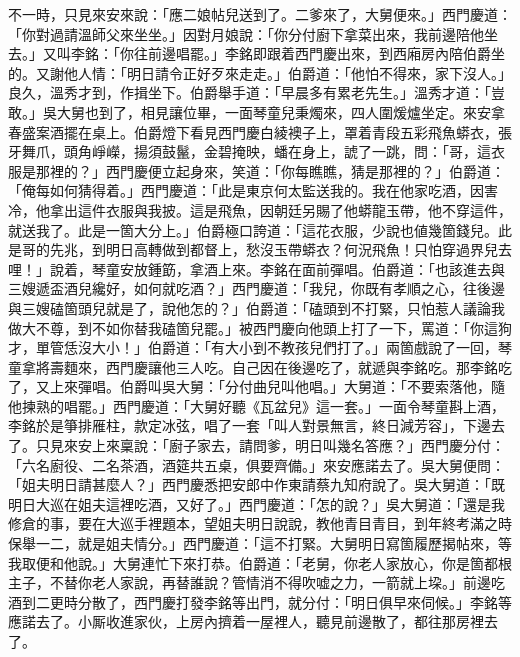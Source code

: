 不一時，只見來安來說：「應二娘帖兒送到了。二爹來了，大舅便來。」西門慶道：「你對過請溫師父來坐坐。」因對月娘說：「你分付廚下拿菜出來，我前邊陪他坐去。」又叫李銘：「你往前邊唱罷。」李銘即跟着西門慶出來，到西廂房內陪伯爵坐的。又謝他人情：「明日請令正好歹來走走。」伯爵道：「他怕不得來，家下沒人。」良久，溫秀才到，作揖坐下。伯爵舉手道：「早晨多有累老先生。」溫秀才道：「豈敢。」吳大舅也到了，相見讓位畢，一面琴童兒秉燭來，四人圍煖爐坐定。來安拿春盛案酒擺在桌上。伯爵燈下看見西門慶白綾襖子上，罩着青段五彩飛魚蟒衣，張牙舞爪，頭角崢嶸，揚須鼓鬣，金碧掩映，蟠在身上，諕了一跳，問：「哥，這衣服是那裡的？」西門慶便立起身來，笑道：「你每瞧瞧，猜是那裡的？」伯爵道：「俺每如何猜得着。」西門慶道：「此是東京何太監送我的。{}我在他家吃酒，因害冷，他拿出這件衣服與我披。這是飛魚，因朝廷另賜了他蟒龍玉帶，他不穿這件，就送我了。此是一箇大分上。」伯爵極口誇道：「這花衣服，少說也値幾箇錢兒。此是哥的先兆，到明日高轉做到都督上，愁沒玉帶蟒衣？何況飛魚！只怕穿過界兒去哩！」{}說着，琴童安放鍾筯，拿酒上來。李銘在面前彈唱。伯爵道：「也該進去與三嫂遞盃酒兒纔好，如何就吃酒？」西門慶道：「我兒，你既有孝順之心，往後邊與三嫂磕箇頭兒就是了，說他怎的？」伯爵道：「磕頭到不打緊，只怕惹人議論我做大不尊，到不如你替我磕箇兒罷。」被西門慶向他頭上打了一下，罵道：「你這狗才，單管恁沒大小！」伯爵道：「有大小到不教孩兒們打了。」兩箇戲說了一回，琴童拿將壽麵來，西門慶讓他三人吃。自己因在後邊吃了，就遞與李銘吃。那李銘吃了，又上來彈唱。伯爵叫吳大舅：「分付曲兒叫他唱。」大舅道：「不要索落他，隨他揀熟的唱罷。」西門慶道：「大舅好聽《瓦盆兒》這一套。」一面令琴童斟上酒，李銘於是箏排雁柱，款定冰弦，唱了一套「叫人對景無言，終日減芳容」，下邊去了。只見來安上來稟說：「廚子家去，請問爹，明日叫幾名答應？」西門慶分付：「六名廚役、二名茶酒，酒筵共五桌，俱要齊備。」來安應諾去了。吳大舅便問：「姐夫明日請甚麼人？」西門慶悉把安郎中作東請蔡九知府說了。吳大舅道：「既明日大巡在姐夫這裡吃酒，又好了。」西門慶道：「怎的說？」吳大舅道：「還是我修倉的事，要在大巡手裡題本，望姐夫明日說說，教他青目青目，到年終考滿之時保舉一二，就是姐夫情分。」西門慶道：「這不打緊。大舅明日寫箇履歷揭帖來，等我取便和他說。」大舅連忙下來打恭。伯爵道：「老舅，你老人家放心，你是箇都根主子，不替你老人家說，再替誰說？管情消不得吹嘘之力，一箭就上垜。」{}前邊吃酒到二更時分散了，西門慶打發李銘等出門，就分付：「明日俱早來伺候。」李銘等應諾去了。小厮收進家伙，上房內擠着一屋裡人，聽見前邊散了，都往那房裡去了。

